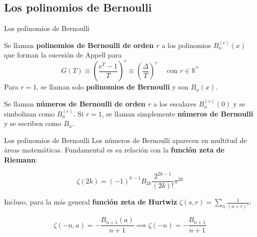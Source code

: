 \documentclass{beamer}
\newenvironment{definicion}[1][]{
  \begin{tcolorbox}[colback=red!10, colframe=red!80!black, title=Definición\ #1, fonttitle=\bfseries]
}{
  \end{tcolorbox}
}
\newcommand{\field}{\mathbb{K}} %
\begin{document}
\subsection{Los polinomios de Bernoulli}
  \begin{frame}{Los polinomios de Bernoulli}
    \begin{definicion}
      Se llaman \textbf{polinomios de Bernoulli de orden $r$} a los polinomios $B_n^{(r)}(x)$ que forman la sucesión de Appell para
    \begin{equation*}
        G(T) \equiv \left(\frac{e^T - 1}{T}\right)^r \equiv \left(\frac{\Delta}{T}\right)^r \quad \text{ con } r \in \field^*
    \end{equation*}
    Para $r = 1$, se llaman solo \textbf{polinomios de Bernoulli} y son $B_n(x)$.
    \end{definicion}

    \begin{definicion}
    Se llaman \textbf{números de Bernoulli de orden $r$} a los escalares $B_n^{(r)}(0)$ y se simbolizan como $B_n^{(r)}$. Si $r=1$, se llaman simplemente \textbf{números de Bernoulli} y se escriben como $B_n$.
\end{definicion}
\end{frame}

\begin{frame}{Los polinomios de Bernoulli}
  Los números de Bernoulli aparecen en multitud de áreas matemáticas.
  Fundamental es su relación con la \textbf{función zeta de Riemann}:
  \begin{block}{}
    \begin{equation*}
      \zeta(2k) = (-1)^{k-1}B_{2k}\frac{2^{2k-1}}{(2k)!}\pi^{2k}
    \end{equation*}
  \end{block}
  Incluso, para la más general \textbf{función zeta de Hurtwiz} $ \zeta(s, r) = \sum_{n} \frac{1}{(n+r)^s}$:
  \begin{block}{}
    \begin{equation*}
      \zeta (-n, a) = -\frac{B_{n+1}(a)}{n+1} \implies \zeta (-n) = - \frac{B_{n+1}}{n+1}
    \end{equation*}
  \end{block}
\end{frame}
\end{document}
